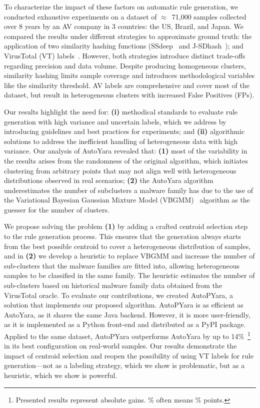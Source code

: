 To characterize the impact of these factors on automatic rule generation, we conducted exhaustive experiments on a dataset of $\approx$~71,000 samples collected over 8 years by an AV company in 3 countries: the US, Brazil, and Japan. We compared the results under different strategies to approximate ground truth: the application of two similarity hashing functions (SSdeep~\cite{kornblum2006identifying} and J-SDhash~\cite{botacin2021_ssdeephashing}); and VirusTotal (VT) labels~\cite{DBLP:journals/corr/abs-2006-10615}. However, both strategies introduce distinct trade-offs regarding precision and data volume. Despite producing homogeneous clusters, similarity hashing limits sample coverage and introduces methodological variables like the similarity threshold. AV labels are comprehensive and cover most of the dataset, but result in heterogeneous clusters with increased False Positives (FPs). 

Our results highlight the need for: \textbf{(i)} methodical standards to evaluate rule generation with high variance and uncertain labels, which we address by introducing guidelines and best practices for experiments; and \textbf{(ii)} algorithmic solutions to address the inefficient handling of heterogeneous data with high variance. Our analysis of AutoYara revealed that: \textbf{(1)} most of the variability in the results arises from the randomness of the original algorithm, which initiates clustering from arbitrary points that may not align well with heterogeneous distributions observed in real scenarios; \textbf{(2)} the AutoYara algorithm underestimates the number of subclusters a malware family has due to the use of the Variational Bayesian Gaussian Mixture Model (VBGMM)~\cite{bishop2006pattern} algorithm as the guesser for the number of clusters.

We propose solving the problem \textbf{(1)} by adding a crafted centroid selection step to the rule generation process. This ensures that the generation always starts from the best possible centroid to cover a heterogeneous distribution of samples, and in \textbf{(2)} we develop a heuristic to replace VBGMM and increase the number of sub-clusters that the malware families are fitted into, allowing heterogeneous samples to be classified in the same family. The heuristic estimates the number of sub-clusters based on historical malware family data obtained from the VirusTotal oracle. To evaluate our contributions, we created AutoPYara, a solution that implements our proposed algorithm. AutoPYara is as efficient as AutoYara, as it shares the same Java backend. However, it is more user-friendly, as it is implemented as a Python front-end and distributed as a PyPI package. Applied to the same dataset, AutoPYara outperforms AutoYara by up to 14\%~\footnote{Presented results represent absolute gains. \% often means \% points.} in its best configuration on real-world samples. Our results demonstrate the impact of centroid selection and reopen the possibility of using VT labels for rule generation—not as a labeling strategy, which we show is problematic, but as a heuristic, which we show is powerful.